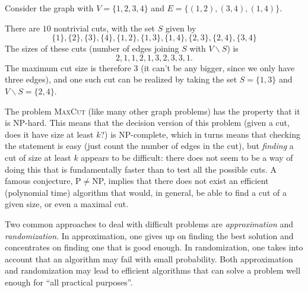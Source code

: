 \begin{example}
 Consider the graph with $V=\{1,2,3,4\}$ and $E=\{(1,2),(3,4),(1,4)\}$.
 \begin{figure}[h!]
  \centering
 \end{figure}
 There are $10$ nontrivial cuts, with the set $S$ given by
 \begin{equation*}
  \{1\}, \{2\}, \{3\}, \{4\}, \{1,2\}, \{1,3\}, \{1,4\}, \{2,3\}, \{2,4\}, \{3,4\} 
 \end{equation*}
The sizes of these cuts (number of edges joining $S$ with $V\backslash S$) is
\begin{equation*}
 2, 1, 1, 2, 1, 3, 2, 3, 3, 1.
\end{equation*}
The maximum cut size is therefore $3$ (it can't be any bigger, since we only have three edges), and one such cut can be realized by taking the set $S=\{1,3\}$ and $V\backslash S=\{2,4\}$. 
\end{example}

The problem \textsc{MaxCut} (like many other graph problems) has the property that it is NP-hard. This means that the decision version of this problem (given a cut, does it have size at least $k$?) is NP-complete, which in turns means that checking the statement is easy (just count the number of edges in the cut), but {\em finding} a cut of size at least $k$ appears to be difficult: there does not seem to be a way of doing this that is fundamentally faster than to test all the possible cuts. A famous conjecture, P$\neq$NP, implies that there does not exist an efficient (polynomial time) algorithm that would, in general, be able to find a cut of a given size, or even a maximal cut. 

Two common approaches to deal with difficult problems are {\em approximation} and {\em randomization}. In approximation, one gives up on finding the best solution and concentrates on finding one that is good enough. In randomization, one takes into account that an algorithm may fail with small probability. Both approximation and randomization may lead to efficient algorithms that can solve a problem well enough for ``all practical purposes''. 

